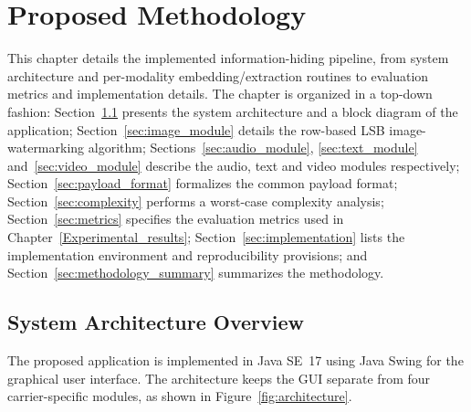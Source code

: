 \chapter{Proposed Methodology}
\label{Proposed_Methodology}

This chapter details the implemented information-hiding pipeline, from system architecture and per-modality embedding/extraction routines to evaluation metrics and implementation details. The chapter is organized in a top-down fashion: Section~\ref{sec:architecture} presents the system architecture and a block diagram of the application; Section~\ref{sec:image_module} details the row-based LSB image-watermarking algorithm; Sections~\ref{sec:audio_module}, \ref{sec:text_module} and~\ref{sec:video_module} describe the audio, text and video modules respectively; Section~\ref{sec:payload_format} formalizes the common payload format; Section~\ref{sec:complexity} performs a worst-case complexity analysis; Section~\ref{sec:metrics} specifies the evaluation metrics used in Chapter~\ref{Experimental_results}; Section~\ref{sec:implementation} lists the implementation environment and reproducibility provisions; and Section~\ref{sec:methodology_summary} summarizes the methodology.

\section{System Architecture Overview}
\label{sec:architecture}

The proposed application is implemented in Java SE~17 using Java Swing for the graphical user interface. The architecture keeps the GUI separate from four carrier-specific modules, as shown in Figure~\ref{fig:architecture}.

